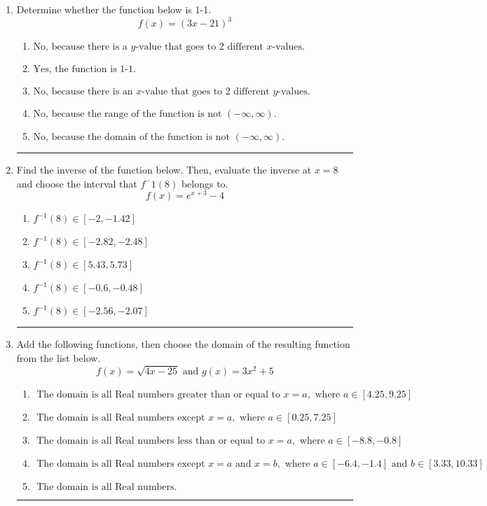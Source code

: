 \documentclass[14pt]{extbook}
\newcommand{\litem}[1]{\item#1\hspace*{-1cm}\rule{\textwidth}{0.4pt}}
\begin{document}
\begin{enumerate}
\litem{
Determine whether the function below is 1-1.\[ f(x) = (3 x - 21)^3 \]\begin{enumerate}[label=\Alph*.]
\item \( \text{No, because there is a $y$-value that goes to 2 different $x$-values.} \)
\item \( \text{Yes, the function is 1-1.} \)
\item \( \text{No, because there is an $x$-value that goes to 2 different $y$-values.} \)
\item \( \text{No, because the range of the function is not $(-\infty, \infty)$.} \)
\item \( \text{No, because the domain of the function is not $(-\infty, \infty)$.} \)

\end{enumerate} }
\litem{
Find the inverse of the function below. Then, evaluate the inverse at $x = 8$ and choose the interval that $f^-1(8)$ belongs to.\[ f(x) = e^{x+3}-4 \]\begin{enumerate}[label=\Alph*.]
\item \( f^{-1}(8) \in [-2, -1.42] \)
\item \( f^{-1}(8) \in [-2.82, -2.48] \)
\item \( f^{-1}(8) \in [5.43, 5.73] \)
\item \( f^{-1}(8) \in [-0.6, -0.48] \)
\item \( f^{-1}(8) \in [-2.56, -2.07] \)

\end{enumerate} }
\litem{
Add the following functions, then choose the domain of the resulting function from the list below.\[ f(x) = \sqrt{4x-25}  \text{ and } g(x) = 3x^{2} + 5 \]\begin{enumerate}[label=\Alph*.]
\item \( \text{ The domain is all Real numbers greater than or equal to } x = a, \text{ where } a \in [4.25, 9.25] \)
\item \( \text{ The domain is all Real numbers except } x = a, \text{ where } a \in [0.25, 7.25] \)
\item \( \text{ The domain is all Real numbers less than or equal to } x = a, \text{ where } a \in [-8.8, -0.8] \)
\item \( \text{ The domain is all Real numbers except } x = a \text{ and } x = b, \text{ where } a \in [-6.4, -1.4] \text{ and } b \in [3.33, 10.33] \)
\item \( \text{ The domain is all Real numbers. } \)


\end{enumerate}}
\end{enumerate}
\end{document}
